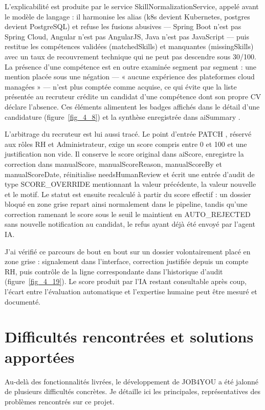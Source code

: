 L’explicabilité est produite par le service Skill\-Normalization\-Service, appelé avant le modèle de langage : il harmonise les alias (k8s devient Kubernetes, postgres devient PostgreSQL) et refuse les fusions abusives — Spring Boot n’est pas Spring Cloud, Angular n’est pas AngularJS, Java n’est pas JavaScript — puis restitue les compétences validées (matchedSkills) et manquantes (missingSkills) avec un taux de recouvrement technique qui ne peut pas descendre sous 30/100. La présence d’une compétence est en outre examinée segment par segment : une mention placée sous une négation — « aucune expérience des plateformes cloud managées » — n’est plus comptée comme acquise, ce qui évite que la liste présentée au recruteur crédite un candidat d’une compétence dont son propre CV déclare l’absence. Ces éléments alimentent les badges affichés dans le détail d’une candidature (figure~\ref{fig_4_8}) et la synthèse enregistrée dans aiSummary \cite{ref23}.

L’arbitrage du recruteur est lui aussi tracé. Le point d’entrée PATCH , réservé aux rôles RH et Administrateur, exige un score compris entre 0 et 100 et une justification non vide. Il conserve le score original dans aiScore, enregistre la correction dans manualScore, manual\-Score\-Reason, manualScoreBy et manual\-Score\-Date, réinitialise needs\-Human\-Review et écrit une entrée d’audit de type SCORE\_OVERRIDE mentionnant la valeur précédente, la valeur nouvelle et le motif. Le statut est ensuite recalculé à partir du score effectif : un dossier bloqué en zone grise repart ainsi normalement dans le pipeline, tandis qu’une correction ramenant le score sous le seuil le maintient en AUTO\_REJECTED sans nouvelle notification au candidat, le refus ayant déjà été envoyé par l’agent IA.

J’ai vérifié ce parcours de bout en bout sur un dossier volontairement placé en zone grise : signalement dans l’interface, correction justifiée depuis un compte RH, puis contrôle de la ligne correspondante dans l’historique d’audit (figure~\ref{fig_4_19}). Le score produit par l’IA restant consultable après coup, l’écart entre l’évaluation automatique et l’expertise humaine peut être mesuré et documenté.

\section{Difficultés rencontrées et solutions apportées}
\label{sec_4_5}
Au-delà des fonctionnalités livrées, le développement de JOB4YOU a été jalonné de plusieurs difficultés concrètes. Je détaille ici les principales, représentatives des problèmes rencontrés sur ce projet.

